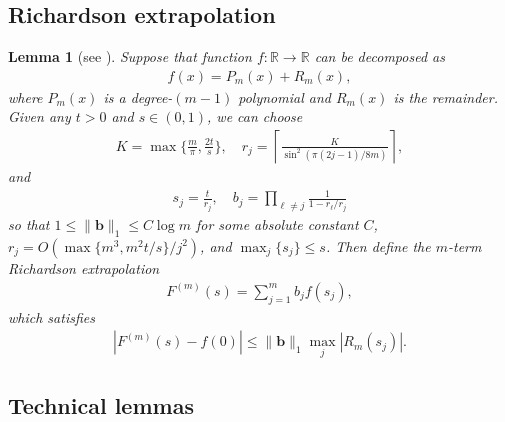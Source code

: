 \documentclass[aps,pra,reprint,groupedaddress,floatfix]{revtex4-2}
\newtheorem{lemma}{Lemma}
\newcommand{\mb}{\mathbb}
\newcommand{\sz}[1]{{\color{blue} Shuo: #1}}
\begin{document}
\subsection{Richardson extrapolation}\label{sec:Richardson}
\begin{lemma}[{see \cite[Lemma A.9]{wang2025randomized}}]
\label{lem:richardson-extrapolation}
    Suppose that function $f\colon \mb R \to \mathbb{R}$ can be decomposed as 
    \begin{align*}
        f(x) = P_m(x)+R_m(x),
    \end{align*} 
    where $P_m(x)$ is a degree-$(m-1)$ polynomial and $R_m(x)$ is the remainder. Given any $t > 0$ and $s\in (0,1)$, we can choose 
    \begin{align*}
        K = \max\Big\{\frac{m}{\pi}, \frac{2t}{s}\Big\}, \quad r_j =\left\lceil \frac{K}{\sin^2(\pi(2j-1)/8m)}\right\rceil,
    \end{align*}
    and
    \begin{align*}
        s_j = \frac{t}{r_j}, \quad b_j=\prod_{\ell \neq j} \frac{1}{1-r_\ell/r_j}
    \end{align*}
    so that $1\le \|\mathbf{b}\|_1 \le C\log m$ for some absolute constant $C$, $r_j=O(\max\{m^3, m^2t/s\}/j^2)$, and $\max_{j}\{ s_j \}\le s$. Then define the $m$-term Richardson extrapolation \begin{align}
        \label{eq_richardson extrapolation}
        F^{(m)}(s)=\sum_{j=1}^m b_j f(s_j),
    \end{align}
    which satisfies \begin{align}
    \label{eq:error-F}
        |F^{(m)}(s)-f(0)|\le \|\mathbf{b}\|_1 \max_j|R_{m}(s_j)|.
    \end{align}
\end{lemma}

\subsection{Technical lemmas}
\end{document}
